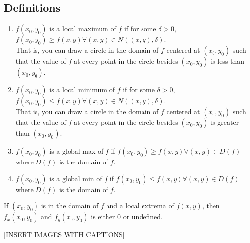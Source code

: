\subsection{Definitions}
\begin{enumerate}
	\item $f(x_0, y_0)$ is a local maximum of $f$ if for some $\delta > 0$, $f(x_0, y_0) \geq f(x, y) \forall (x,y) \in N((x,y),\delta)$.\\ 
	That is, you can draw a circle in the domain of $f$ centered at $(x_0, y_0)$ such that the value of $f$ at every point in the circle besides $(x_0, y_0)$ is less than $(x_0, y_0)$.
	\item $f(x_0, y_0)$ is a local minimum of $f$ if for some $\delta > 0$, $f(x_0, y_0) \leq f(x,y) \forall (x,y) \in N((x,y),\delta)$.\\
	That is, you can draw a circle in the domain of $f$ centered at $(x_0, y_0)$ such that the value of $f$ at every point in the circle besides $(x_0, y_0)$ is greater than $(x_0, y_0)$.
	\item $f(x_0, y_0)$ is a global max of $f$ if $f(x_0, y_0) \geq f(x,y) \forall (x,y) \in D(f)$ where $D(f)$ is the domain of $f$.
	\item $f(x_0, y_0)$ is a global min of $f$ if $f(x_0, y_0) \leq f(x,y) \forall (x,y) \in D(f)$ where $D(f)$ is the domain of $f$.
\end{enumerate}
\begin{theorem}
	If $(x_0, y_0)$ is in the domain of $f$ and a local extrema of $f(x,y)$, then $f_x(x_0, y_0)$ and $f_y(x_0, y_0)$ is either 0 or undefined.
\end{theorem}

[INSERT IMAGES WITH CAPTIONS]